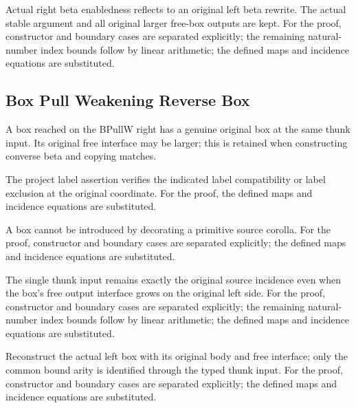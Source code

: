 Actual right beta enabledness reflects to an original left beta rewrite. The actual stable argument and all original larger free-box outputs are kept.
For the proof, constructor and boundary cases are separated explicitly; the remaining natural-number index bounds follow by linear arithmetic; the defined maps and incidence equations are substituted.
\par{}

\subsection{Box Pull Weakening Reverse Box}
A box reached on the BPullW right has a genuine original box at the same thunk input. Its original free interface may be larger; this is retained when constructing converse beta and copying matches.

The project label assertion verifies the indicated label compatibility or label exclusion at the original coordinate.
For the proof, the defined maps and incidence equations are substituted.
\par{}

A box cannot be introduced by decorating a primitive source corolla.
For the proof, constructor and boundary cases are separated explicitly; the defined maps and incidence equations are substituted.
\par{}

The single thunk input remains exactly the original source incidence even when the box's free output interface grows on the original left side.
For the proof, constructor and boundary cases are separated explicitly; the remaining natural-number index bounds follow by linear arithmetic; the defined maps and incidence equations are substituted.
\par{}

Reconstruct the actual left box with its original body and free interface; only the common bound arity is identified through the typed thunk input.
For the proof, constructor and boundary cases are separated explicitly; the defined maps and incidence equations are substituted.
\par{}

